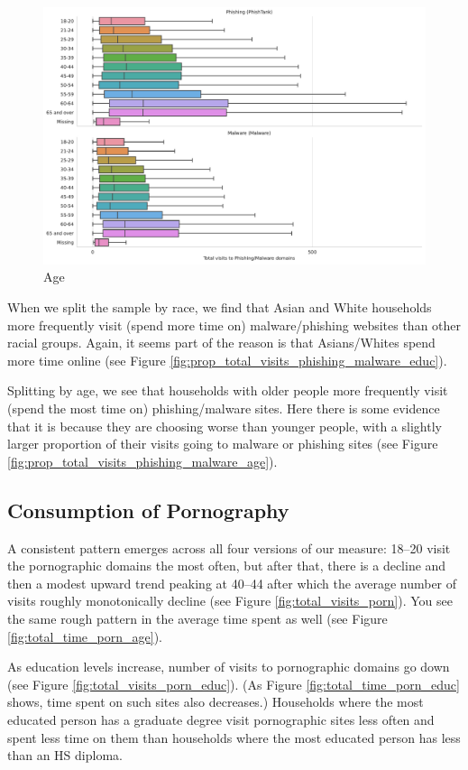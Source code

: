 \documentclass[12pt, letterpaper]{article}
\begin{document}
\begin{figure}[!htb]
\begin{minipage}[b]{0.32\textwidth}
	\includegraphics[width=\textwidth]{../figs/total_visits_phishing_malware_age.pdf}\\Age
	\end{minipage}
\end{figure}

When we split the sample by race, we find that Asian and White households more frequently visit (spend more time on) malware/phishing websites than other racial groups. Again, it seems part of the reason is that Asians/Whites spend more time online (see Figure \ref{fig:prop_total_visits_phishing_malware_educ}).

Splitting by age, we see that households with older people more frequently visit (spend the most time on) phishing/malware sites. Here there is some evidence that it is because they are choosing worse than younger people, with a slightly larger proportion of their visits going to malware or phishing sites (see Figure \ref{fig:prop_total_visits_phishing_malware_age}).

\subsection{Consumption of Pornography}
A consistent pattern emerges across all four versions of our measure: 18--20 visit the pornographic domains the most often, but after that, there is a decline and then a modest upward trend peaking at 40--44 after which the average number of visits roughly monotonically decline (see Figure \ref{fig:total_visits_porn}). You see the same rough pattern in the average time spent as well (see Figure \ref{fig:total_time_porn_age}).

As education levels increase, number of visits to pornographic domains go down (see Figure \ref{fig:total_visits_porn_educ}). (As Figure \ref{fig:total_time_porn_educ} shows, time spent on such sites also decreases.) Households where the most educated person has a graduate degree visit pornographic sites less often and spent less time on them than households where the most educated person has less than an HS diploma.
\end{document}
